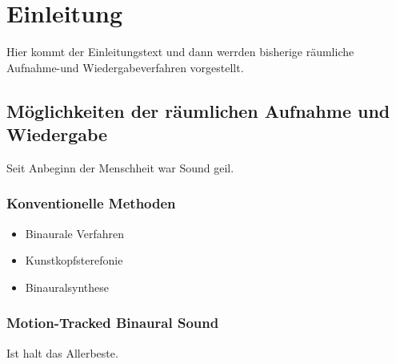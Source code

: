 \chapter[Einleitung]{Einleitung} 
\label{chap:1_EINL}

Hier kommt der Einleitungstext und dann werrden bisherige räumliche Aufnahme-und Wiedergabeverfahren vorgestellt.

\section{Möglichkeiten der räumlichen Aufnahme und Wiedergabe}
\label{sec:1_RAUW}

Seit Anbeginn der Menschheit war Sound geil.
    
    \subsection{Konventionelle Methoden}
    \label{subsec:1_KM}

        \begin{itemize}
            \item Binaurale Verfahren
            \item Kunstkopfsterefonie
            \item Binauralsynthese
        \end{itemize}
        
    \subsection{Motion-Tracked Binaural Sound}
    \label{subsec:1_MTBS}

    Ist halt das Allerbeste.